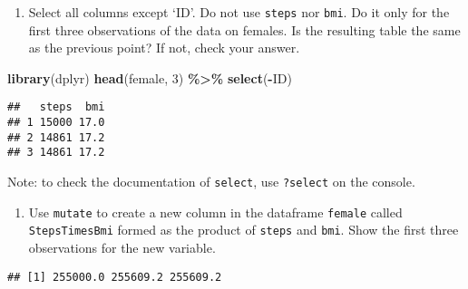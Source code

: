 \documentclass[
]{book}
\newenvironment{Shaded}{\begin{snugshade}}{\end{snugshade}}
\newcommand{\AttributeTok}[1]{\textcolor[rgb]{0.13,0.29,0.53}{#1}}
\newcommand{\DecValTok}[1]{\textcolor[rgb]{0.00,0.00,0.81}{#1}}
\newcommand{\FunctionTok}[1]{\textcolor[rgb]{0.13,0.29,0.53}{\textbf{#1}}}
\newcommand{\NormalTok}[1]{#1}
\newcommand{\OtherTok}[1]{\textcolor[rgb]{0.56,0.35,0.01}{#1}}
\newcommand{\SpecialCharTok}[1]{\textcolor[rgb]{0.81,0.36,0.00}{\textbf{#1}}}
\providecommand{\tightlist}{%
  \setlength{\itemsep}{0pt}\setlength{\parskip}{0pt}}
\begin{document}
\begin{enumerate}
\def\labelenumi{\arabic{enumi}.}
\setcounter{enumi}{2}
\tightlist
\item
  Select all columns except `ID'. Do not use \texttt{steps} nor \texttt{bmi}. Do it only for the first three observations of the data on females. Is the resulting table the same as the previous point? If not, check your answer.
\end{enumerate}

\begin{Shaded}
\begin{Highlighting}[]
\FunctionTok{library}\NormalTok{(dplyr)}
\FunctionTok{head}\NormalTok{(female, }\DecValTok{3}\NormalTok{) }\SpecialCharTok{\%\textgreater{}\%}
  \FunctionTok{select}\NormalTok{(}\SpecialCharTok{{-}}\NormalTok{ID)}
\end{Highlighting}
\end{Shaded}

\begin{verbatim}
##   steps  bmi
## 1 15000 17.0
## 2 14861 17.2
## 3 14861 17.2
\end{verbatim}

Note: to check the documentation of \texttt{select}, use \texttt{?select} on the console.

\begin{enumerate}
\def\labelenumi{\arabic{enumi}.}
\setcounter{enumi}{3}
\tightlist
\item
  Use \texttt{mutate} to create a new column in the dataframe \texttt{female} called \texttt{StepsTimesBmi} formed as the product of \texttt{steps} and \texttt{bmi}. Show the first three observations for the new variable.
\end{enumerate}

\begin{Shaded}
\end{Shaded}

\begin{verbatim}
## [1] 255000.0 255609.2 255609.2
\end{verbatim}
\end{document}
